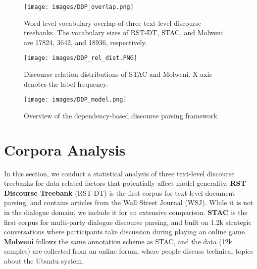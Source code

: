 \documentclass[11pt]{article}
\begin{document}
\begin{figure}[t!]
    \begin{center}
    \texttt{[image: images/DDP\_overlap.png]}
    \end{center}
     \caption{Word level vocabulary overlap of three text-level  discourse treebanks. The vocabulary sizes of RST-DT, STAC, and Molweni are 17824, 3642, and 18936, respectively.}
    \label{fig:vocab-overlap}
\end{figure}

\begin{figure}[t!]
    \begin{center}
    \texttt{[image: images/DDP\_rel\_dist.PNG]}
    \end{center}
    \caption{Discourse relation distributions of STAC and Molweni. X axis denotes the label frequency.}
    \label{fig:relation-dist}
\end{figure}

\begin{figure*}[ht!]
    \begin{center}
    \texttt{[image: images/DDP\_model.png]}
    \end{center}
    \caption{Overview of the dependency-based discourse parsing framework.}
    \label{fig:framework}
\end{figure*}

\section{Corpora Analysis}
\label{sec:corpus_analysis}
In this section, we conduct a statistical analysis of three text-level discourse treebanks for data-related factors that potentially affect model generality.
\newline\noindent \textbf{RST Discourse Treebank} (RST-DT) \cite{carlson2002rst} is the first corpus for text-level document parsing, and contains articles from the Wall Street Journal (WSJ). While it is not in the dialogue domain, we include it for an extensive comparison.
\newline\noindent \textbf{STAC} \cite{asher2016STAC} is the first corpus for multi-party dialogue discourse parsing, and built on 1.2k strategic conversations where participants take discussion during playing an online game.
\newline\noindent \textbf{Molweni} \cite{li2020molweni} follows the same annotation scheme as STAC, and the data (12k samples) are collected from an online forum, where people discuss technical topics about the Ubuntu system.
\end{document}

